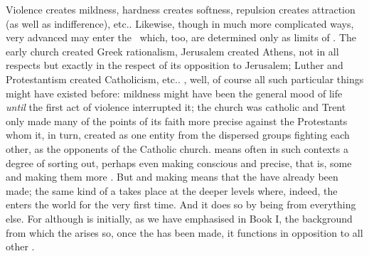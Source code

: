 Violence creates mildness, hardness creates softness, repulsion creates
attraction (as well as indifference), etc.. Likewise, though in much more
complicated ways, very advanced  may enter the \hoa\ which, too, are
determined only as limits of .  The early church created Greek
rationalism, Jerusalem created Athens, not in all respects but exactly in the
respect of its opposition to Jerusalem; Luther and Protestantism created
Catholicism, etc..
, well, of course all such particular things might have existed
before: mildness might have been the general mood of life {\em until} the first
act of violence interrupted it; the church was catholic and Trent only made many
of the points of its faith more precise against the Protestants whom it, in
turn, created as one entity from the dispersed groups fighting each other, as
the opponents of the Catholic church. 
means often in such contexts a degree of sorting out, perhaps even making
conscious and precise, that is,  some  and
making them more . But  and making
 means that the  have already been made; the same
kind of  a  takes place at the deeper levels
where, indeed, the  enters the world for the very first time.
And it does so by being  from everything else.
For although  is initially, as we have emphasised in Book
I, the background from which the  arises so, once the
 has been made, it functions in opposition to all other
. 

